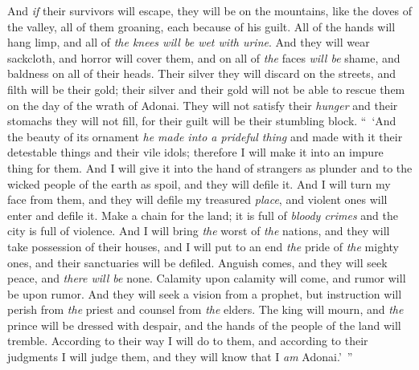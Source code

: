 \begin{biblechapter}
\verse And \textit{if} their survivors will escape, they will be on the mountains, like the doves of the valley, all of them groaning, each because of his guilt.
\verse All of the hands will hang limp, and all of \textit{the knees will be wet with urine}.
\verse And they will wear sackcloth, and horror will cover them, and on all of \textit{the} faces \textit{will be} shame, and baldness on all of their heads.
\verse Their silver they will discard on the streets, and filth will be their gold; their silver and their gold will not be able to rescue them on the day of the wrath of Adonai. They will not satisfy their \textit{hunger} and their stomachs they will not fill, for their guilt will be their stumbling block.
 “ ‘And the beauty of its ornament \textit{he made into a prideful thing} and made with it their detestable things and their vile idols; therefore I will make it into an impure thing for them.
\verse And I will give it into the hand of strangers as plunder and to the wicked people of the earth as spoil, and they will defile it.
\verse And I will turn my face from them, and they will defile my treasured \textit{place}, and violent ones will enter and defile it.
\verse Make a chain for the land; it is full of \textit{bloody crimes} and the city is full of violence.
\verse And I will bring \textit{the} worst of \textit{the} nations, and they will take possession of their houses, and I will put to an end \textit{the} pride of \textit{the} mighty ones, and their sanctuaries will be defiled.
\verse Anguish comes, and they will seek peace, and \textit{there will be} none.
\verse Calamity upon calamity will come, and rumor will be upon rumor. And they will seek a vision from a prophet, but instruction will perish from \textit{the} priest and counsel from \textit{the} elders.
\verse The king will mourn, and \textit{the} prince will be dressed with despair, and the hands of the people of the land will tremble. According to their way I will do to them, and according to their judgments I will judge them, and they will know that I \textit{am} Adonai.’ ”
\end{biblechapter}

